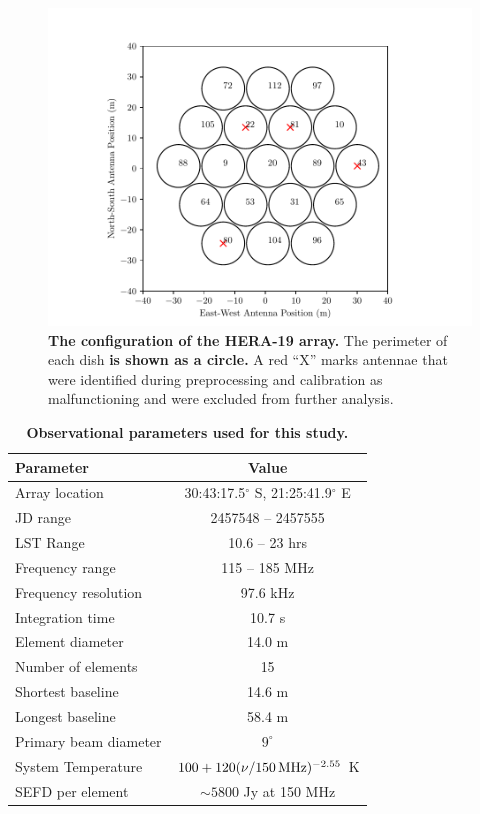 \documentclass[twocolumn, trackchanges]{aastex61}
\newcommand{\edited}[1]{{\bf \color{red} #1}}
\begin{document}
\begin{figure}
\centering
\hspace{-0.5cm}\includegraphics[scale=0.6]{antpos_hera19.pdf}
\caption{\edited{The configuration of the HERA-19 array.} The perimeter of each dish \edited{is shown as a circle.} 
A red ``X'' marks antennae that were identified during preprocessing and calibration as malfunctioning and were excluded from further analysis.}
\label{fig:antpos}
\end{figure}


\begin{table}
\centering
\caption{\edited{Observational parameters used for this study.}}
\begin{tabular}{lc}
\hline
Parameter & Value \\
\hline
Array location & 30:43:17.5$^\circ$ S, 21:25:41.9$^\circ$ E \\
JD range & 2457548 -- 2457555 \\
LST Range & 10.6 -- 23 hrs \\
Frequency range & 115 -- 185 MHz \\
Frequency resolution & 97.6 kHz \\
Integration time & 10.7 s\\
Element diameter & 14.0 m\\
Number of elements & 15 \\
Shortest baseline & 14.6 m \\
Longest baseline & 58.4 m \\
Primary beam diameter & $9^{\circ}$ \\
System Temperature & $100 + 120(\nu / 150\,{\rm MHz})^{-2.55}$ K\\
SEFD per element & $\sim 5800$ Jy at 150 MHz\\

\hline
\end{tabular}
\label{tab:params}
\end{table}
\end{document}
